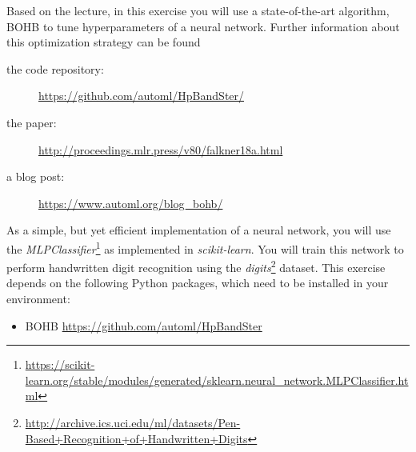\documentclass{exam}
\begin{document}
Based on the lecture, in this exercise you will use a state-of-the-art algorithm, BOHB to tune hyperparameters of a neural network. Further information about this optimization strategy can be found

\begin{description}
\item[the code repository:] \url{https://github.com/automl/HpBandSter/}
\item[the paper:] \url{http://proceedings.mlr.press/v80/falkner18a.html}
\item[a blog post:] \url{https://www.automl.org/blog_bohb/}
\end{description}

As a simple, but yet efficient implementation of a neural network, you will use the \emph{MLPClassifier}\footnote{\url{https://scikit-learn.org/stable/modules/generated/sklearn.neural_network.MLPClassifier.html}} as implemented in \emph{scikit-learn}. You will train this network to perform handwritten digit recognition using the \emph{digits}\footnote{\url{http://archive.ics.uci.edu/ml/datasets/Pen-Based+Recognition+of+Handwritten+Digits}} dataset. This exercise depends on the following Python packages, which need to be installed in your environment:
\begin{itemize}
\item BOHB \url{https://github.com/automl/HpBandSter}
\end{itemize}
\end{document}
